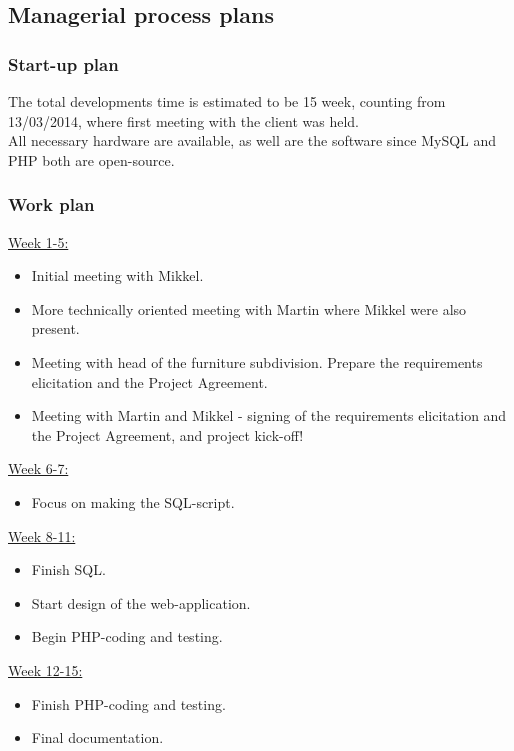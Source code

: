 \documentclass[12pt]{article}
\begin{document}
\subsection{Managerial process plans}
\subsubsection{Start-up plan}
The total developments time is estimated to be 15 week, counting from 13/03/2014, where first meeting with the client was held. \\
All necessary hardware are available, as well are the software since MySQL and PHP both are open-source.
\subsubsection{Work plan}
\underline{Week 1-5:}
\begin{itemize}
  \item Initial meeting with Mikkel.
  \item More technically oriented meeting with Martin where Mikkel were also present.
  \item Meeting with head of the furniture subdivision.
  Prepare the requirements elicitation and the Project Agreement.
  \item Meeting with Martin and Mikkel - signing of the requirements elicitation and the Project Agreement, and project kick-off!
\end{itemize}
\underline{Week 6-7:}
\begin{itemize}
  \item Focus on making the SQL-script.
\end{itemize}
\underline{Week 8-11:}
\begin{itemize}
  \item Finish SQL.
  \item Start design of the web-application.
  \item Begin PHP-coding and testing.
\end{itemize}
\underline{Week 12-15:}
\begin{itemize}
  \item Finish PHP-coding and testing.
  \item Final documentation.
\end{itemize}
\end{document}
